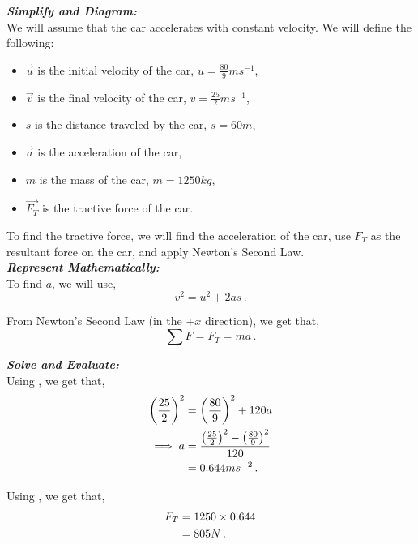 \begin{subquestions}
\textbf{\textit{Simplify and Diagram:}} \\
We will assume that the car accelerates with constant velocity. We will define the following:
\begin{itemize}
	\item $\vec{u}$ is the initial velocity of the car, $u=\frac{80}{9}ms^{-1}$,
	\item $\vec{v}$ is the final velocity of the car, $v=\frac{25}{2}ms^{-1}$,
	\item $s$ is the distance traveled by the car, $s=60m$,
	\item $\vec{a}$ is the acceleration of the car,
	\item $m$ is the mass of the car, $m=1250kg$,
	\item $\vec{F_T}$ is the tractive force of the car.
\end{itemize}
To find the tractive force, we will find the acceleration of the car, use $F_T$ as the resultant force on the car, and apply Newton's Second Law.\\
	

	
	
\textbf{\textit{Represent Mathematically:}} \\
To find $a$, we will use,
\begin{equation}
	v^2=u^2+2as \label{2006:q5:AEqn1} \,.
\end{equation}

From Newton's Second Law (in the $+x$ direction), we get that,
\begin{equation}
	\sum F = F_T = ma \label{2006:q5:FEqn1} \,.
\end{equation}




\textbf{\textit{Solve and Evaluate:}} \\
Using , we get that,
\begin{align}
	\left(\frac{25}{2}\right)^2 & = \left(\frac{80}{9}\right)^2 + 120a \nonumber \\
	\implies a & = \frac{\left(\frac{25}{2}\right)^2-\left(\frac{80}{9}\right)^2}{120} \nonumber \\
	           & = 0.644ms^{-2} \,.
\end{align}

Using , we get that,
\begin{align}
	F_T & = 1250 \times 0.644 \nonumber \\
	    & = 805N \,.
\end{align}

\end{subquestions}